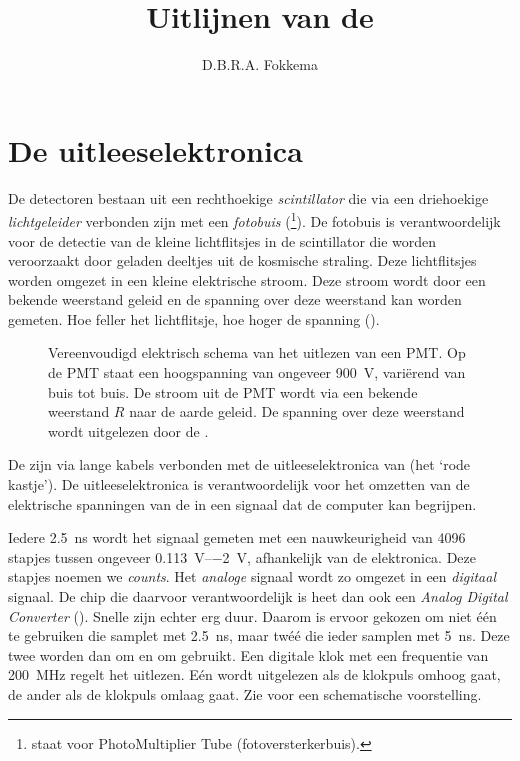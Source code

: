 

\title{Uitlijnen van de \adcs}
\author{D.B.R.A. Fokkema}



\maketitle

\section{De \hisparc uitleeselektronica}

De \hisparc detectoren bestaan uit een rechthoekige \emph{scintillator}
die via een driehoekige \emph{lichtgeleider} verbonden zijn met een
\emph{fotobuis} (\pmt \footnote{\pmt staat voor PhotoMultiplier Tube
(fotoversterkerbuis).}).  De fotobuis is verantwoordelijk voor de detectie
van de kleine lichtflitsjes in de scintillator die worden veroorzaakt door
geladen deeltjes uit de kosmische straling.  Deze lichtflitsjes worden
omgezet in een kleine elektrische stroom.  Deze stroom wordt door een
bekende weerstand geleid en de spanning over deze weerstand kan worden
gemeten.  Hoe feller het lichtflitsje, hoe hoger de spanning
().

\begin{figure}
\centering

\caption{Vereenvoudigd elektrisch schema van het uitlezen van een PMT.  Op
de PMT staat een hoogspanning van ongeveer \SI{900}{\volt}, variërend van
buis tot buis.  De stroom uit de PMT wordt via een bekende weerstand $R$
naar de aarde geleid.  De spanning over deze weerstand wordt uitgelezen
door de \adcs.}
\label{fig:schema-pmt}
\end{figure}

De \pmts zijn via lange kabels verbonden met de uitleeselektronica van
\hisparc (het `rode kastje').  De uitleeselektronica is verantwoordelijk
voor het omzetten van de elektrische spanningen van de \pmts in een
signaal dat de computer kan begrijpen.

Iedere \SI{2.5}{\nano\second} wordt het signaal gemeten met een
nauwkeurigheid van \num{4096} stapjes tussen ongeveer
\SIrange{+0.113}{-2}{\volt}, afhankelijk van de elektronica.  Deze stapjes
noemen we \emph{\adc counts}.  Het \emph{analoge} signaal wordt zo omgezet
in een \emph{digitaal} signaal.  De chip die daarvoor verantwoordelijk is
heet dan ook een \emph{Analog Digital Converter} (\adc).  Snelle \adcs
zijn echter erg duur.  Daarom is ervoor gekozen om niet één \adc te
gebruiken die samplet met \SI{2.5}{\nano\second}, maar twéé \adcs die
ieder samplen met \SI{5}{\nano\second}.  Deze twee \adcs worden dan om en
om gebruikt.  Een digitale klok met een frequentie van
\SI{200}{\mega\hertz} regelt het uitlezen.  Eén \adc wordt uitgelezen als
de klokpuls omhoog gaat, de ander als de klokpuls omlaag gaat.  Zie
 voor een schematische voorstelling.

